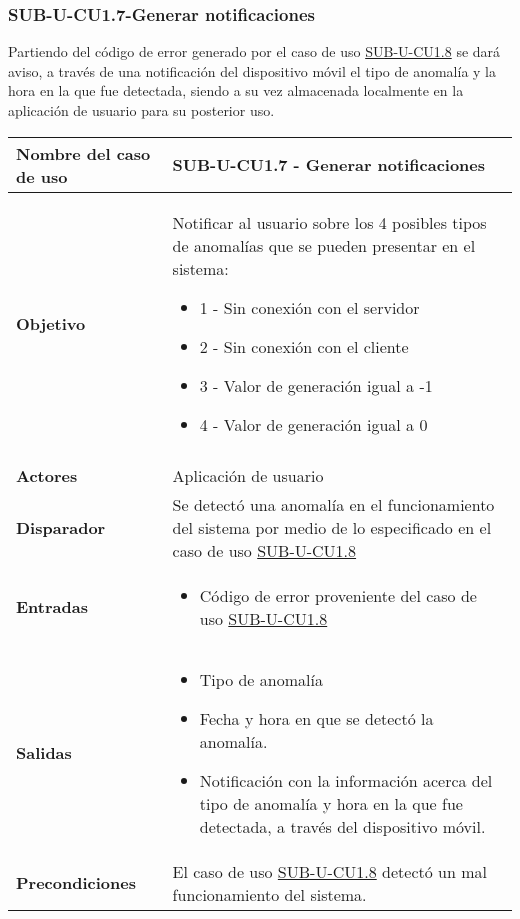 \subsubsection{SUB-U-CU1.7-Generar notificaciones}\label{SUB-U-CU1.7}
Partiendo del código de error generado por el caso de uso \hyperref[SUB-U-CU1.8]{SUB-U-CU1.8} se dará aviso, a través de una notificación del dispositivo móvil el tipo de anomalía y la hora en la que fue detectada, siendo a su vez almacenada localmente en la aplicación de usuario para su posterior uso.  
\begin{longtable}{|J{5cm}|J{10.3cm}|}
	\hline
	\textbf{Nombre del caso de uso} &
		SUB-U-CU1.7 - Generar notificaciones
 \\ \hline
	\textbf{Objetivo} &
		Notificar al usuario sobre los 4 posibles tipos de anomalías que  se pueden presentar en el sistema:
		\begin{itemize}
			\item 1 - Sin conexión con el servidor
			\item 2 - Sin conexión con el cliente
			\item 3 - Valor de generación igual a -1
			\item 4 - Valor de generación igual a 0
		\end{itemize} \\ \hline
 \\ \hline
	\textbf{Actores} &
		Aplicación de usuario \\ \hline 
	\textbf{Disparador} & 
		Se detectó una anomalía en el funcionamiento del sistema por medio de lo especificado en el caso de uso \hyperref[SUB-U-CU1.8]{SUB-U-CU1.8}  \\ \hline
	\textbf{Entradas} & 
		\begin{itemize}
				\item Código de error proveniente del caso de uso \hyperref[SUB-U-CU1.8]{SUB-U-CU1.8}
		\end{itemize}\\ \hline 
	\textbf{Salidas} & 
		\begin{itemize}
		    \item Tipo de anomalía
			\item Fecha y hora en que se detectó la anomalía.
			\item Notificación con la información acerca del tipo de anomalía y hora en la que fue detectada, a través del dispositivo móvil.
		\end{itemize} \\ \hline
	\textbf{Precondiciones} &
		El caso de uso \hyperref[SUB-U-CU1.8]{SUB-U-CU1.8} detectó un mal funcionamiento del sistema.\\ \hline

\end{longtable}
